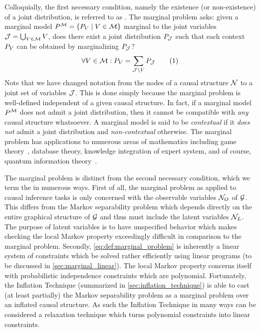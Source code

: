 \documentclass[aps, 10pt, english, twoside, pra, nofootinbib, tightenlines, longbibliography]{revtex4-1}
\begin{document}
    Colloquially, the first necessary condition, namely the existence (or non-existence) of a joint distribution, is referred to as . The marginal problem asks: given a marginal model $\prob^{\mscenario} = \bc{\prob[V] \mid V \in \mscenario}$ marginal to the joint variables $\mathcal{J} = \bigcup_{V \in \mathcal{M}} V$, does there exist a joint distribution $\prob[\jointvar]$ such that each context $\prob[V]$ can be obtained by marginalizing $\prob[\jointvar]$?
    \[ \forall V \in \mscenario : \prob[V] = \sum_{\jointvar \setminus V} \prob[\jointvar] \eq \label{eq:def:marginal_problem}\]
    Note that we have changed notation from the nodes of a causal structure $\mathcal{N}$ to a joint set of variables $\mathcal{J}$. This is done simply because the marginal problem is well-defined independent of a given causal structure. In fact, if a marginal model $\prob^{\mscenario}$ does not admit a joint distribution, then it cannot be compatible with \textit{any} causal structure whatsoever. A marginal model is said to be \textit{contextual} if it \textit{does not} admit a joint distribution and \textit{non-contextual} otherwise. The marginal problem has applications to numerous areas of mathematics including game theory~\cite{Vorobev_1962}, database theory, knowledge integration of expert system, and of course, quantum information theory~\cite{Fritz_2011}.

    The marginal problem is distinct from the second necessary condition, which we term the  in numerous ways. First of all, the marginal problem as applied to causal inference tasks is only concerned with the observable variables $\mathcal{N}_{O}$ of $\mathcal{G}$. This differs from the Markov separability problem which depends directly on the entire graphical structure of $\mathcal{G}$ and thus must include the latent variables $\mathcal{N}_{L}$. The purpose of latent variables is to have unspecified behavior which makes checking the local Markov property exceedingly difficult in comparison to the marginal problem. Secondly, \cref{eq:def:marginal_problem} is inherently a linear system of constraints which be solved rather efficiently using linear programs (to be discussed in \cref{sec:marginal_linear}). The local Markov property concerns itself with probabilistic independence constraints which are polynomial. Fortunately, the Inflation Technique (summarized in \cref{sec:inflation_technique}) is able to cast (at least partially) the Markov separability problem as a marginal problem over an inflated causal structure. As such the Inflation Technique in many ways can be considered a relaxation technique which turns polynomial constraints into linear constraints.
\end{document}
